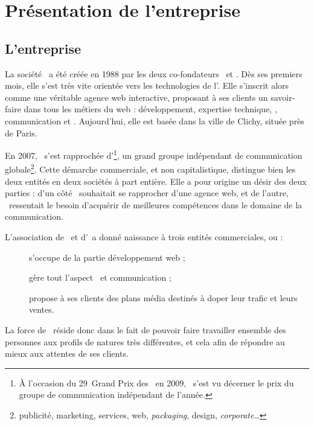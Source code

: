 \chapter{Présentation de l'entreprise}

\section{L'entreprise \asensio}

La société \asensio\ a été créée en 1988 par les deux co-fondateurs \apotencier\ et \apascal. Dès ses premiers mois, elle s'est très vite orientée vers les technologies de l'\ainternet. Elle s'inscrit alors comme une véritable agence web interactive, proposant à ses clients un savoir-faire dans tous les métiers du web : développement, expertise technique, \awm, communication et \awd. Aujourd'hui, elle est basée dans la ville de Clichy, située près de Paris.

En 2007, \asensio\ s'est rapprochée d'\aextreme\footnote{À l'occasion du 29\ieme\ Grand Prix des \aagencesannee\ en 2009, \aextreme\ s'est vu décerner le prix du groupe de communication indépendant de l'année.}, un grand groupe in\-dé\-pen\-dant de communication globale\footnote{publicité, marketing, services, web, \textit{packaging}, design, \textit{corporate}\dots}. Cette démarche commerciale, et non capitalistique, distingue bien les deux entités en deux sociétés à part entière. Elle a pour origine un désir des deux parties : d'un côté \aextreme\ souhaitait se rapprocher d'une agence web, et de l'autre, \asensio\ ressentait le besoin d'acquérir de meilleures compétences dans le domaine de la communication.

L'association de \asensio\ et d'\aextreme\ a donné naissance à trois entités commerciales, ou \abusfull :

\begin{description}
	\item[\asl] s'occupe de la partie développement web ;
	\item[\aes] gère tout l'aspect \awm\ et communication ;
	\item[\aesm] propose à ses clients des plans média destinés à doper leur trafic et leurs ventes.
\end{description}

La force de \asensio\ réside donc dans le fait de pouvoir faire travailler ensemble des personnes aux profils de natures très différentes, et cela afin de répondre au mieux aux attentes de ses clients.

